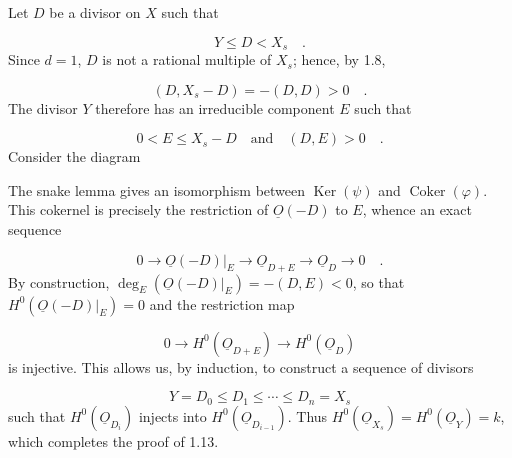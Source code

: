 Let $D$ be a divisor on $X$ such that

\begin{equation*}
Y\leq D<X_s \quad .
\end{equation*}
Since $d=1$, $D$ is not a rational multiple of $X_s$; hence, by 1.8,

\begin{equation*}
(D,X_s-D)=-(D,D)>0 \quad .
\end{equation*}
The divisor $Y$ therefore has an irreducible component $E$ such that

\begin{equation*}
0<E\leq X_s-D \quad\text{and}\quad (D,E)>0 \quad .
\end{equation*}
Consider the diagram

\begin{center}
\end{center}
The snake lemma gives an isomorphism between $\operatorname{Ker}(\psi)$ and
$\operatorname{Coker}(\varphi)$.  This cokernel is precisely the restriction of
$\underline{O}(-D)$ to $E$, whence an exact sequence

\begin{equation*}
0\longrightarrow\underline{O}(-D)|_E
\longrightarrow\underline{O}_{D+E}
\longrightarrow\underline{O}_D\longrightarrow0 \quad .
\end{equation*}
By construction,
$\deg_E(\underline{O}(-D)|_E)=-(D,E)<0$, so that
$H^0(\underline{O}(-D)|_E)=0$ and the restriction map

\begin{equation*}
0\longrightarrow H^0(\underline{O}_{D+E})
\longrightarrow H^0(\underline{O}_D)
\end{equation*}
is injective.  This allows us, by induction, to construct a sequence of divisors

\begin{equation*}
Y=D_0\leq D_1\leq\cdots\leq D_n=X_s
\end{equation*}
such that $H^0(\underline{O}_{D_i})$ injects into
$H^0(\underline{O}_{D_{i-1}})$.  Thus
$H^0(\underline{O}_{X_s})=H^0(\underline{O}_Y)=k$, which completes the proof of
1.13.


